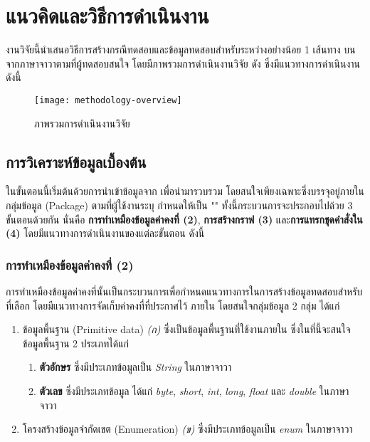 \section{แนวคิดและวิธีการดำเนินงาน}

งานวิจัยนี้นำเสนอวิธีการสร้างกรณีทดสอบและข้อมูลทดสอบสำหรับ{\TestPath}ระหว่าง{\CUT}อย่างน้อย 1 เส้นทาง 
บน{\StaticInformation}จาก{\sourcecode}ภาษาจาวาตามที่ผู้ทดสอบสนใจ โดยมีภาพรวมการดำเนินงานวิจัย 
ดัง ซึ่งมีแนวทางการดำเนินงานดังนี้

\begin{sidewaysfigure}
    \centering
    \texttt{[image: methodology-overview]}
    \caption{ภาพรวมการดำเนินงานวิจัย}
    \label{fig:methodologyoverview}
\end{sidewaysfigure}

\subsection{การวิเคราะห์ข้อมูลเบื้องต้น}

ในขั้นตอนนี้เริ่มต้นด้วยการนำเข้าข้อมูล{\sourcecode}จาก{\Repository} เพื่อนำมารวบรวม{\StaticInformation} 
โดยสนใจเพียงเฉพาะ{\class}ซึ่งบรรจุอยู่ภายในกลุ่มข้อมูล (Package) ตามที่ผู้ใช้งานระบุ กำหนดให้เป็น "\FirstTimeDefine{\CUT}{\CUTEN}" 
ทั้งนี้กระบวนการจะประกอบไปด้วย 3 ขั้นตอนด้วยกัน นั่นคือ
{\bf การทำเหมืองข้อมูลค่าคงที่ (2)}, {\bf การสร้างกราฟ (3)} และ{\bf การแทรกชุดคำสั่งใน{\sourcecode} (4)} โดยมีแนวทางการดำเนินงานของแต่ละขั้นตอน 
ดังนี้

\subsubsection{การทำเหมืองข้อมูลค่าคงที่ (2)}

การทำเหมืองข้อมูลค่าคงที่นั้นเป็นกระบวนการเพื่อกำหนดแนวทางการในการสร้างข้อมูลทดสอบสำหรับ{\TestPath}ที่เลือก โดยมีแนวทางการจัดเก็บค่าคงที่ที่ประกาศไว้
ภายใน{\sourcecode} โดยสนใจกลุ่มข้อมูล 2 กลุ่ม ได้แก่

\begin{enumerate}
    \item ข้อมูลพื้นฐาน (Primitive data) {\it (ก)} ซึ่งเป็นข้อมูลพื้นฐานที่ใช้งานภายใน{\class} ซึ่งในที่นี้จะสนใจข้อมูลพื้นฐาน 2 ประเภทได้แก่
        \begin{enumerate}
            \item {\bf ตัวอักษร} ซึ่งมีประเภทข้อมูลเป็น {\it String} ในภาษาจาวา
            \item {\bf ตัวเลข} ซึ่งมีประเภทข้อมูล ได้แก่ {\it byte}, {\it short}, {\it int}, {\it long}, {\it float} 
               และ {\it double} ในภาษาจาวา
        \end{enumerate}
    \item โครงสร้างข้อมูลจำกัดเขต (Enumeration) {\it (ข)} ซึ่งมีประเภทข้อมูลเป็น {\it enum} ในภาษาจาวา
\end{enumerate}

